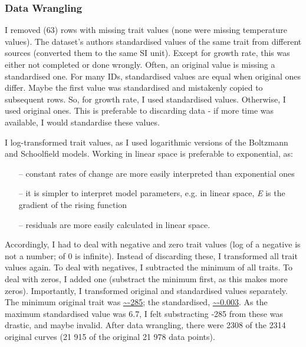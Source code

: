 \documentclass[11pt]{article}
\begin{document}
\subsubsection*{Data Wrangling}
I removed (63) rows with missing trait values (none were missing temperature values). The dataset's authors standardised values of the same trait from different sources (converted them to the same SI unit). Except for growth rate, this was either not completed or done wrongly. Often, an original value is missing a standardised one. For many IDs, standardised values are equal when original ones differ. Maybe the first value was standardised and mistakenly copied to subsequent rows. So, for growth rate, I used standardised values. Otherwise, I used original ones. This is preferable to discarding data - if more time was available, I would %
standardise these values.

I log-transformed trait values, as I used logarithmic versions of the Boltzmann and Schoolfield models.
Working in linear space is preferable to exponential, as:
\begin{itemize}
	\item[--] constant rates of change are more easily interpreted than exponential ones
	\item[--] it is simpler to interpret model parameters, e.g. in linear space, \textit{E} is the gradient of the rising function
	\item[--] residuals are more easily calculated in linear space.
\end{itemize}
Accordingly, I had to deal with negative and zero trait values (log of a negative is not a number; of 0 is infinite). Instead of discarding these, I transformed all trait values again. To deal with negatives, I subtracted the minimum of all traits. To deal with zeros, I added one (substract the minimum first, as this makes more zeros). Importantly, I transformed original and standardised values separately. The minimum original trait was \url{~-285}; the standardised, \url{~-0.003}. As the maximum standardised value was 6.7, I felt substracting -285 from these was drastic, and maybe invalid. After data wrangling, there were 2308 of the 2314 original curves (21 915 of the original 21 978 data points). %
  
\end{document}
